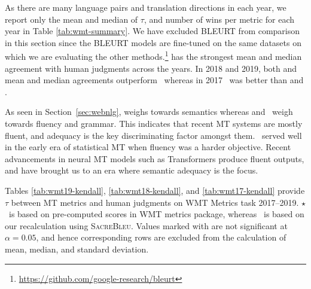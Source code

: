 As there are many language pairs and translation directions in each year, we report only the mean and median of $\tau$, and number of wins per metric for each year in Table \ref{tab:wmt-summary}.
We have excluded BLEURT from comparison in this section since the BLEURT models are fine-tuned on the same datasets on which we are evaluating the other methods.\footnote{\url{https://github.com/google-research/bleurt}}
 has the strongest mean and median agreement with human judgments across the years.
In 2018 and 2019, both  and  mean and median agreements outperform \bleu\, whereas in 2017 \bleu\ was better than  and .


As seen in Section~\ref{sec:webnlg},  weighs towards semantics whereas  and \bleu\ weigh towards fluency and grammar.
This indicates that recent MT systems are mostly fluent, and adequacy is the key discriminating factor amongst them.
\bleu\ served well in the early era of statistical MT when fluency was a harder objective. 
Recent advancements in neural MT models such as Transformers \cite{vaswani-2017-attention} produce fluent outputs, and have brought us to an era where semantic adequacy is the focus.





Tables \ref{tab:wmt19-kendall}, \ref{tab:wmt18-kendall}, and \ref{tab:wmt17-kendall} provide $\tau$ between MT metrics and human judgments on WMT Metrics task 2017--2019. 
$\star$\bleu\ is based on pre-computed scores in WMT metrics package, whereas \bleu\ is based on our recalculation using \textsc{SacreBleu}. 
Values marked with \insig are not significant at $\alpha=0.05$, and hence corresponding rows are excluded from the calculation of mean, median, and standard deviation.

